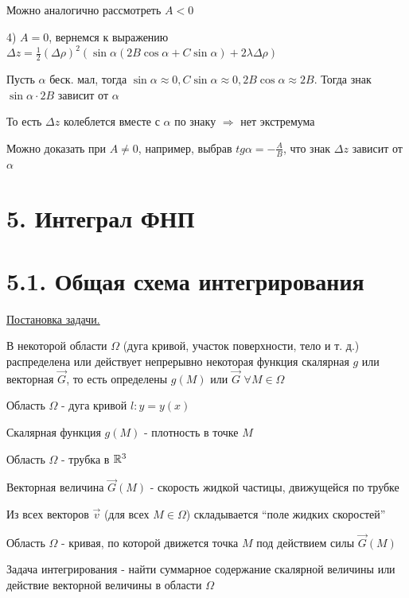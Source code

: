 \documentclass[12pt]{article}
\begin{document}
    \Nota Можно аналогично рассмотреть $A < 0$

    4) $A = 0$, вернемся к выражению $\Delta z = \frac{1}{2} (\Delta \rho)^2 (\sin\alpha(2B\cos\alpha + C\sin\alpha) + 2\lambda\Delta\rho)$

    Пусть $\alpha$ беск. мал, тогда $\sin\alpha \approx 0, C\sin\alpha \approx 0, 2B\cos\alpha \approx 2B$. Тогда знак $\sin\alpha \cdot 2B$ зависит от $\alpha$

    То есть $\Delta z$ колеблется вместе с $\alpha$ по знаку $\Longrightarrow$ нет экстремума

    Можно доказать при $A \neq 0$, например, выбрав $tg \alpha = -\frac{A}{B}$, что знак $\Delta z$ зависит от $\alpha$



    \clearpage


    \section{5. Интеграл ФНП}


    \section{5.1. Общая схема интегрирования}

    \underline{Постановка задачи.}

    В некоторой области $\Omega$ (дуга кривой, участок поверхности, тело и т. д.)
    распределена или действует непрерывно некоторая функция скалярная $g$ или векторная $\overrightarrow{G}$,
    то есть определены $g(M)$ или $\overrightarrow{G}$ $\forall M \in \Omega$

    \Ex Область $\Omega$ - дуга кривой $l : y = y(x)$

    Скалярная функция $g(M)$ - плотность в точке $M$

    \Ex Область $\Omega$ - трубка в $\mathbb{R}^3$

    Векторная величина $\overrightarrow{G}(M)$ - скорость жидкой частицы, движущейся по трубке

    Из всех векторов $\overrightarrow{v}$ (для всех $M \in \Omega$) складывается \enquote{поле жидких скоростей}

    \Ex Область $\Omega$ - кривая, по которой движется точка $M$ под действием силы $\overrightarrow{G}(M)$

    Задача интегрирования - найти суммарное содержание скалярной величины или действие векторной величины в области $\Omega$
\end{document}
